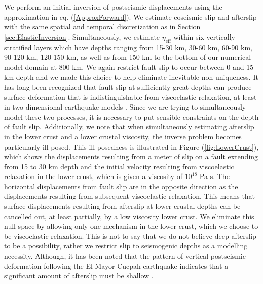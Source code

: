 \documentclass[review]{elsarticle}
\begin{document}
We perform an initial inversion of postseismic displacements using the approximation in eq. (\ref{ApproxForward}).  We estimate coseismic slip and afterslip with the same spatial and temporal discretization as in Section \ref{sec:ElasticInversion}. Simultaneously, we estimate $\eta_{\mathrm{eff}}$ within six vertically stratified layers which have depths ranging from 15-30 km, 30-60 km, 60-90 km, 90-120 km, 120-150 km, as well as from 150 km to the bottom of our numerical model domain at 800 km.  We again restrict fault slip to occur between 0 and 15 km depth and we made this choice to help eliminate inevitable non uniqueness.  It has long been recognized that fault slip at sufficiently great depths can produce surface deformation that is indistinguishable from viscoelastic relaxation, at least in two-dimensional earthquake models \citep{Savage1990}. Since we are trying to simultaneously model these two processes, it is necessary to put sensible constraints on the depth of fault slip.  Additionally, we note that when simultaneously estimating afterslip in the lower crust and a lower crustal viscosity, the inverse problem becomes particularly ill-posed. This ill-posedness is illustrated in Figure (\ref{fig:LowerCrust}), which shows the displacements resulting from a meter of slip on a fault extending from 15 to 30 km depth and the initial velocity resulting from viscoelastic relaxation in the lower crust, which is given a viscosity of $10^{18}$ Pa s.  The horizontal displacements from fault slip are in the opposite direction as the displacements resulting from subsequent viscoelastic relaxation.  This means that surface displacements resulting from afterslip at lower crustal depths can be cancelled out, at least partially, by a low viscosity lower crust.  We eliminate this null space by allowing only one mechanism in the lower crust, which we choose to be viscoelastic relaxation.  This is not to say that we do not believe deep afterslip to be a possibility, rather we restrict slip to seismogenic depths as a modelling necessity. Although, it has been noted that the pattern of vertical postseismic deformation following the El Mayor-Cucpah earthquake indicates that a significant amount of afterslip must be shallow \citep{Rollins2015}.  
 
\end{document}
